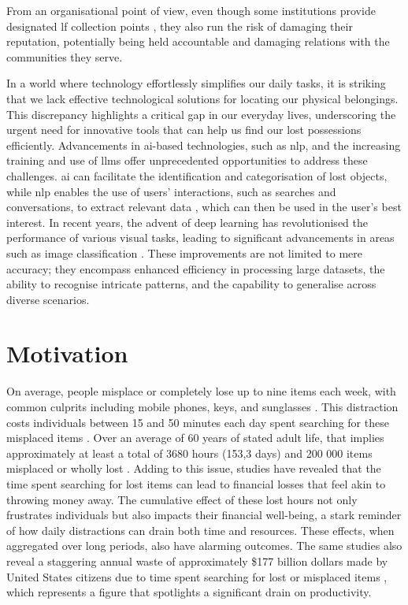 From an organisational point of view, even though some institutions provide designated \ac{lf} collection points \cite{Tan2023}, they also run the risk of damaging their reputation, potentially being held accountable and damaging relations with the communities they serve.

In a world where technology effortlessly simplifies our daily tasks, it is striking that we lack effective technological solutions for locating our physical belongings. This discrepancy highlights a critical gap in our everyday lives, underscoring the urgent need for innovative tools that can help us find our lost possessions efficiently. Advancements in \ac{ai}-based technologies, such as \ac{nlp}, and the increasing training and use of \acp{llm} offer unprecedented opportunities to address these challenges. \ac{ai} can facilitate the identification and categorisation of lost objects, while \ac{nlp} enables the use of users' interactions, such as searches and conversations, to extract relevant data \cite{Prawira2024}, which can then be used in the user's best interest. In recent years, the advent of deep learning has revolutionised the performance of various visual tasks, leading to significant advancements in areas such as image classification \cite{Liu2022}. These improvements are not limited to mere accuracy; they encompass enhanced efficiency in processing large datasets, the ability to recognise intricate patterns, and the capability to generalise across diverse scenarios. 

\section{Motivation} \label{section:motivation}

On average, people misplace or completely lose up to nine items each week, with common culprits including mobile phones, keys, and sunglasses \cite{Prawira2024}. This distraction costs individuals between 15 and 50 minutes each day spent searching for these misplaced items \cites{Prawira2024, Knierim2012}. Over an average of 60 years of stated adult life, that implies approximately at least a total of 3680 hours (153,3 days) and 200 000 items misplaced or wholly lost \cite{Ahmad2015}. Adding to this issue, studies have revealed that the time spent searching for lost items can lead to financial losses that feel akin to throwing money away. The cumulative effect of these lost hours not only frustrates individuals but also impacts their financial well-being, a stark reminder of how daily distractions can drain both time and resources. These effects, when aggregated over long periods, also have alarming outcomes. The same studies also reveal a staggering annual waste of approximately \$177 billion dollars made by United States citizens \cite{Newswire2010} due to time spent searching for lost or misplaced items \cite{Ahmad2015}, which represents a figure that spotlights a significant drain on productivity.

